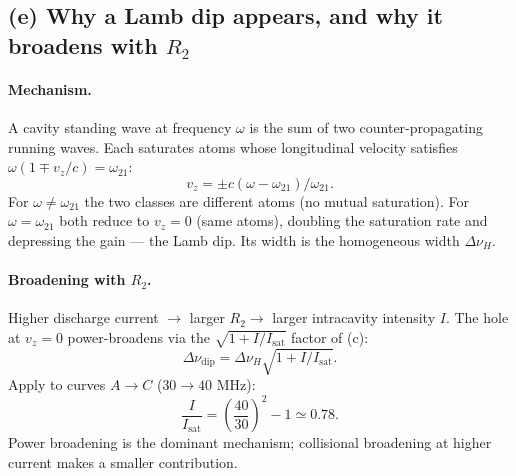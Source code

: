 \documentclass[11pt]{article}
\begin{document}
\subsection*{(e) Why a Lamb dip appears, and why it broadens with $R_{2}$}

\paragraph{Mechanism.} A cavity standing wave at frequency $\omega$ is the sum of two counter-propagating running waves. Each saturates atoms whose longitudinal velocity satisfies $\omega(1\mp v_{z}/c)=\omega_{21}$:
\begin{equation}
v_{z}=\pm c(\omega-\omega_{21})/\omega_{21}.
\end{equation}
For $\omega\neq\omega_{21}$ the two classes are different atoms (no mutual saturation). For $\omega=\omega_{21}$ both reduce to $v_{z}=0$ (same atoms), doubling the saturation rate and depressing the gain --- the Lamb dip. Its width is the homogeneous width $\Delta\nu_{H}$.

\paragraph{Broadening with $R_{2}$.} Higher discharge current $\to$ larger $R_{2}\to$ larger intracavity intensity $I$. The hole at $v_{z}=0$ power-broadens via the $\sqrt{1+I/I_{\mathrm{sat}}}$ factor of (c):
\begin{equation}
\boxed{\;\Delta\nu_{\mathrm{dip}}=\Delta\nu_{H}\sqrt{1+I/I_{\mathrm{sat}}}.\;}
\label{eq:dip-broadening}
\end{equation}
Apply to curves $A\to C$ ($30\to 40$ MHz):
\begin{equation}
\frac{I}{I_{\mathrm{sat}}}=\left(\frac{40}{30}\right)^{2}-1\simeq 0.78.
\end{equation}
Power broadening is the dominant mechanism; collisional broadening at higher current makes a smaller contribution.
\end{document}
